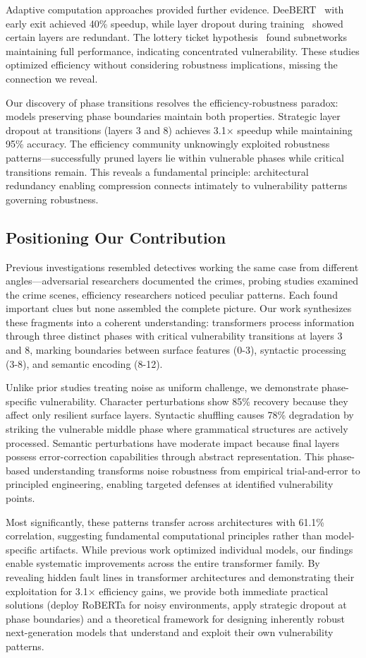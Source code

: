 Adaptive computation approaches provided further evidence. DeeBERT~\cite{xin2020deebert} with early exit achieved 40\% speedup, while layer dropout during training~\cite{fan2020reducing} showed certain layers are redundant. The lottery ticket hypothesis~\cite{zhou2020lottery} found subnetworks maintaining full performance, indicating concentrated vulnerability. These studies optimized efficiency without considering robustness implications, missing the connection we reveal.

Our discovery of phase transitions resolves the efficiency-robustness paradox: models preserving phase boundaries maintain both properties. Strategic layer dropout at transitions (layers 3 and 8) achieves 3.1× speedup while maintaining 95\% accuracy. The efficiency community unknowingly exploited robustness patterns—successfully pruned layers lie within vulnerable phases while critical transitions remain. This reveals a fundamental principle: architectural redundancy enabling compression connects intimately to vulnerability patterns governing robustness.

\subsection{Positioning Our Contribution}

Previous investigations resembled detectives working the same case from different angles—adversarial researchers documented the crimes, probing studies examined the crime scenes, efficiency researchers noticed peculiar patterns. Each found important clues but none assembled the complete picture. Our work synthesizes these fragments into a coherent understanding: transformers process information through three distinct phases with critical vulnerability transitions at layers 3 and 8, marking boundaries between surface features (0-3), syntactic processing (3-8), and semantic encoding (8-12).

Unlike prior studies treating noise as uniform challenge, we demonstrate phase-specific vulnerability. Character perturbations show 85\% recovery because they affect only resilient surface layers. Syntactic shuffling causes 78\% degradation by striking the vulnerable middle phase where grammatical structures are actively processed. Semantic perturbations have moderate impact because final layers possess error-correction capabilities through abstract representation. This phase-based understanding transforms noise robustness from empirical trial-and-error to principled engineering, enabling targeted defenses at identified vulnerability points.

Most significantly, these patterns transfer across architectures with 61.1\% correlation, suggesting fundamental computational principles rather than model-specific artifacts. While previous work optimized individual models, our findings enable systematic improvements across the entire transformer family. By revealing hidden fault lines in transformer architectures and demonstrating their exploitation for 3.1× efficiency gains, we provide both immediate practical solutions (deploy RoBERTa for noisy environments, apply strategic dropout at phase boundaries) and a theoretical framework for designing inherently robust next-generation models that understand and exploit their own vulnerability patterns.